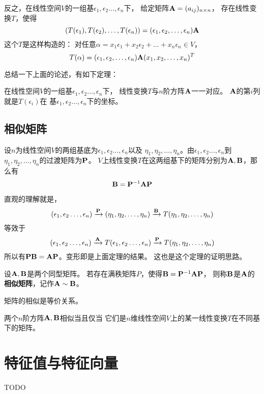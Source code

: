 反之，在线性空间$V$的一组基$\epsilon_1,\epsilon_2\dots,\epsilon_n$下，
给定矩阵$\mathbf{A}=(a_{ij})_{n\times n}$，
存在线性变换$T$，使得
\[ (T(\epsilon_1), T(\epsilon_2),\dots,T(\epsilon_n)) =
  (\epsilon_1,\epsilon_2,\dots,\epsilon_n)\mathbf{A} \]
这个$T$是这样构造的：
对任意$\alpha=x_1\epsilon_1+x_2\epsilon_2+\dots+x_n\epsilon_n\in V$，
\[ T(\alpha) = (\epsilon_1,\epsilon_2,\dots,\epsilon_n)\mathbf{A}
  (x_1,x_2,\dots,x_n)^T \]

总结一下上面的论述，有如下定理：
\begin{theorem}
  在线性空间$V$的一组基$\epsilon_1,\epsilon_2\dots,\epsilon_n$下，
  线性变换$T$与$n$阶方阵$\mathbf{A}$一一对应。
  $\mathbf{A}$的第$i$列就是$T(\epsilon_i)$在
  基$\epsilon_1,\epsilon_2\dots,\epsilon_n$下的坐标。
\end{theorem}

\subsection{相似矩阵}
\begin{theorem}
  设$n$为线性空间$V$的两组基底为$\epsilon_1,\epsilon_2\dots,\epsilon_n$以及
  $\eta_1,\eta_2,\dots,\eta_n$。由$\epsilon_1,\epsilon_2\dots,\epsilon_n$到
  $\eta_1,\eta_2,\dots,\eta_n$的过渡矩阵为$\mathbf{P}$。
  $V$上线性变换$T$在这两组基下的矩阵分别为$\mathbf{A},\mathbf{B}$，那么有
  \[ \mathbf{B} = \mathbf{P}^{-1}\mathbf{A}\mathbf{P} \]  
\end{theorem}

\begin{remark}
  直观的理解就是，
  \begin{displaymath}
    (\epsilon_1,\epsilon_2\dots,\epsilon_n)\xrightarrow{\mathbf{P}}
    (\eta_1,\eta_2,\dots,\eta_n)\xrightarrow{\mathbf{B}}
    T(\eta_1,\eta_2,\dots,\eta_n)
  \end{displaymath}
  等效于
  \begin{displaymath}
  (\epsilon_1,\epsilon_2\dots,\epsilon_n)\xrightarrow{\mathbf{A}}
  T(\epsilon_1,\epsilon_2\dots,\epsilon_n)\xrightarrow{\mathbf{P}}
  T(\eta_1,\eta_2,\dots,\eta_n)
  \end{displaymath}
  所以有$\mathbf{P}\mathbf{B}=\mathbf{A}\mathbf{P}$。变形即是上面定理的结果。
  这也是这个定理的证明思路。
\end{remark}

\begin{definition}[相似矩阵]
  设$\mathbf{A},\mathbf{B}$是两个同型矩阵。
  若存在满秩矩阵$P$，使得$\mathbf{B}=\mathbf{P}^{-1}\mathbf{A}\mathbf{P}$，
  则称$\mathbf{B}$是$\mathbf{A}$的\textbf{相似矩阵}，记作$\mathbf{A}\sim\mathbf{B}$。
\end{definition}

\begin{remark}
  矩阵的相似是等价关系。
\end{remark}

\begin{theorem}[矩阵相似的等价条件]
  两个$n$阶方阵$\mathbf{A},\mathbf{B}$相似当且仅当
  它们是$n$维线性空间$V$上的某一线性变换$T$在不同基下的矩阵。
\end{theorem}

\section{特征值与特征向量}
TODO
